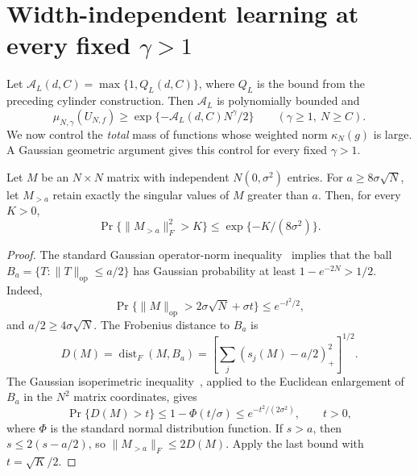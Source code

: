
\section{Width-independent learning at every fixed \texorpdfstring{$\gamma>1$}{gamma > 1}}
\label{sec:learning}
Let $\mathcal A_L(d,C)=\max\{1,Q_L(d,C)\}$, where $Q_L$ is the bound
from the preceding cylinder construction. Then $\mathcal A_L$ is
polynomially bounded and
\begin{equation}\label{eq:uniform-target-mass}
 \mu_{N,\gamma}(U_{N,f})\geq
 \exp\{-\mathcal A_L(d,C)N^\gamma/2\}
 \qquad(\gamma\geq1,\ N\geq C).
\end{equation}
We now control the \emph{total} mass of functions whose weighted norm
$\kappa_N(g)$ is large.
A Gaussian geometric argument gives this control for every fixed $\gamma>1$.

\begin{lemma}\label{lem:gaussian-spectral-tail}
Let $M$ be an $N\times N$ matrix with independent $N(0,\sigma^2)$ entries.
For $a\geq8\sigma\sqrt N$, let $M_{>a}$ retain exactly the singular values of
$M$ greater than $a$. Then, for every $K>0$,
\[
 \Pr\{\|M_{>a}\|_F^2>K\}\leq
 \exp\{-K/(8\sigma^2)\}.
\]
\end{lemma}
\begin{proof}
The standard Gaussian operator-norm inequality~\cite{davidson} implies that
the ball $B_a=\{T:\|T\|_{\mathrm{op}}\leq a/2\}$ has Gaussian
probability at least $1-e^{-2N}>1/2$. Indeed,
\[
 \Pr\{\|M\|_{\mathrm{op}}>2\sigma\sqrt N+\sigma t\}
 \leq e^{-t^2/2},
\]
and $a/2\geq4\sigma\sqrt N$. The Frobenius distance to $B_a$ is
\[
 D(M)=\operatorname{dist}_F(M,B_a)
 =\left[\sum_j(s_j(M)-a/2)_+^2\right]^{1/2}.
\]
The Gaussian isoperimetric inequality~\cite{borell,ledoux}, applied to the Euclidean enlargement
of $B_a$ in the $N^2$ matrix coordinates, gives
\[
 \Pr\{D(M)>t\}\leq1-\Phi(t/\sigma)
 \leq e^{-t^2/(2\sigma^2)},\qquad t>0,
\]
where $\Phi$ is the standard normal distribution function. If $s>a$, then
$s\leq2(s-a/2)$, so $\|M_{>a}\|_F\leq2D(M)$. Apply the last bound with
$t=\sqrt K/2$.
\end{proof}

